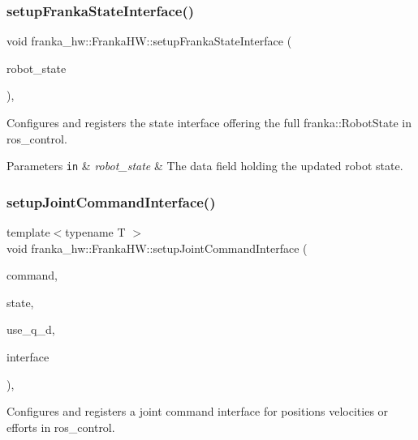 \subsubsection{\texorpdfstring{setup\+Franka\+State\+Interface()}{setupFrankaStateInterface()}}
{\footnotesize\ttfamily void franka\+\_\+hw\+::\+Franka\+H\+W\+::setup\+Franka\+State\+Interface (\begin{DoxyParamCaption}\item[{franka\+::\+Robot\+State \&}]{robot\+\_\+state }\end{DoxyParamCaption})\hspace{0.3cm}{\ttfamily [protected]}, {\ttfamily [virtual]}}

Configures and registers the state interface offering the full franka\+::\+Robot\+State in ros\+\_\+control.


\begin{DoxyParams}[1]{Parameters}
\mbox{\tt in}  & {\em robot\+\_\+state} & The data field holding the updated robot state. \\
\hline
\end{DoxyParams}
\mbox{\label{classfranka__hw_1_1_franka_h_w_a34e707d6e834267f1ad256da5cce0713}} 
\subsubsection{\texorpdfstring{setup\+Joint\+Command\+Interface()}{setupJointCommandInterface()}}
{\footnotesize\ttfamily template$<$typename T $>$ \\
void franka\+\_\+hw\+::\+Franka\+H\+W\+::setup\+Joint\+Command\+Interface (\begin{DoxyParamCaption}\item[{std\+::array$<$ double, 7 $>$ \&}]{command,  }\item[{franka\+::\+Robot\+State \&}]{state,  }\item[{bool}]{use\+\_\+q\+\_\+d,  }\item[{T \&}]{interface }\end{DoxyParamCaption})\hspace{0.3cm}{\ttfamily [inline]}, {\ttfamily [protected]}}

Configures and registers a joint command interface for positions velocities or efforts in ros\+\_\+control.


